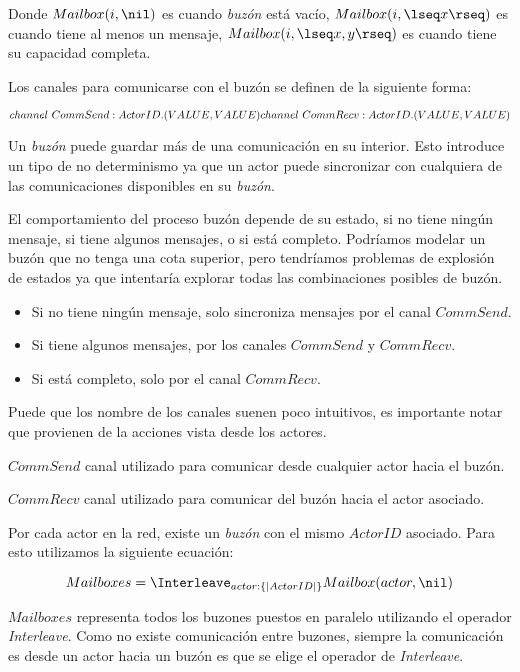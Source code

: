 Donde $Mailbox(i, \nil)$ es cuando \textit{buzón} está vacío, $Mailbox(i, \lseq x \rseq)$ es cuando tiene al menos un mensaje, $Mailbox(i, \lseq x, y \rseq)$ es cuando tiene su capacidad completa.

Los canales para comunicarse con el buzón se definen de la siguiente forma:

\[
channel\ CommSend:ActorID.(VALUE, VALUE)\\
channel\ CommRecv:ActorID.(VALUE, VALUE)
\]

Un \textit{buzón} puede guardar más de una comunicación en su interior. Esto introduce un tipo de no determinismo ya que un actor puede sincronizar con cualquiera de las comunicaciones disponibles en su \textit{buzón}.

El comportamiento del proceso buzón depende de su estado, si no tiene ningún mensaje, si tiene algunos mensajes, o si está completo. Podríamos modelar un buzón que no tenga una cota superior, pero tendríamos problemas de explosión de estados ya que \FDR intentaría explorar todas las combinaciones posibles de buzón.

\begin{itemize}
\item Si no tiene ningún mensaje, solo sincroniza mensajes por el canal $CommSend$.
\item Si tiene algunos mensajes, por los canales $CommSend$ y $CommRecv$.
\item Si está completo, solo por el canal $CommRecv$.
\end{itemize}

Puede que los nombre de los canales suenen poco intuitivos, es importante notar que provienen de la acciones vista desde los actores.

\begin{description}
\item $CommSend$ canal utilizado para comunicar desde cualquier actor hacia el buzón.
\item $CommRecv$ canal utilizado para comunicar del buzón hacia el actor asociado.
\end{description}

Por cada actor en la red, existe un \textit{buzón} con el mismo $ActorID$ asociado. Para esto utilizamos la siguiente ecuación:

\[
Mailboxes = \Interleave_{actor : \{| ActorID |\} } Mailbox(actor, \nil) 
\]

$Mailboxes$ representa todos los buzones puestos en paralelo utilizando el operador \textit{Interleave}. Como no existe comunicación entre buzones, siempre la comunicación es desde un actor hacia un buzón es que se elige el operador de \textit{Interleave}.

